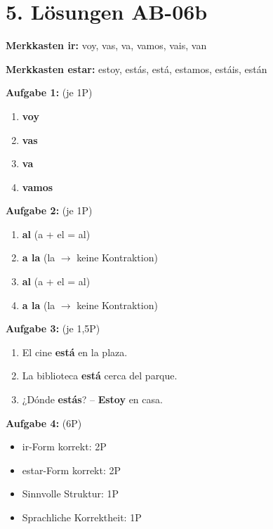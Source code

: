 \documentclass[11pt, a4paper]{article}
\newcommand{\loesung}[1]{\textcolor{loesung}{\textbf{#1}}}
\begin{document}
\section*{5. Lösungen AB-06b}

\textbf{Merkkasten ir:}
voy, vas, va, vamos, vais, van

\textbf{Merkkasten estar:}
estoy, estás, está, estamos, estáis, están

\vspace{0.5em}

\textbf{Aufgabe 1:} (je 1P)
\begin{enumerate}[label=\alph*)]
    \item \loesung{voy}
    \item \loesung{vas}
    \item \loesung{va}
    \item \loesung{vamos}
\end{enumerate}

\textbf{Aufgabe 2:} (je 1P)
\begin{enumerate}[label=\alph*)]
    \item \loesung{al} (a + el = al)
    \item \loesung{a la} (la $\rightarrow$ keine Kontraktion)
    \item \loesung{al} (a + el = al)
    \item \loesung{a la} (la $\rightarrow$ keine Kontraktion)
\end{enumerate}

\textbf{Aufgabe 3:} (je 1,5P)
\begin{enumerate}[label=\alph*)]
    \item El cine \loesung{está} en la plaza.
    \item La biblioteca \loesung{está} cerca del parque.
    \item ¿Dónde \loesung{estás}? -- \loesung{Estoy} en casa.
\end{enumerate}

\textbf{Aufgabe 4:} (6P)
\begin{itemize}
    \item ir-Form korrekt: 2P
    \item estar-Form korrekt: 2P
    \item Sinnvolle Struktur: 1P
    \item Sprachliche Korrektheit: 1P
\end{itemize}

\end{document}

